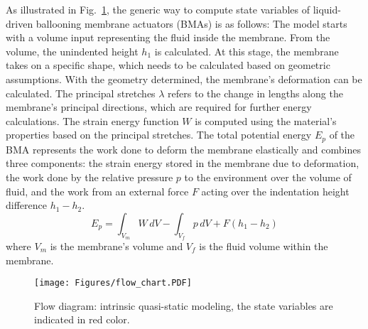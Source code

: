 As illustrated in Fig.~\ref{fig: flow_chart}, the generic way to compute state variables of liquid-driven ballooning membrane actuators (BMAs) is as follows:
The model starts with a volume input representing the fluid inside the membrane. From the volume, the unindented height $h_1$ is calculated. At this stage, the membrane takes on a specific shape, which needs to be calculated based on geometric assumptions. With the geometry determined, the membrane’s deformation can be calculated. The principal stretches $\lambda$ refers to the change in lengths along the membrane's principal directions, which are required for further energy calculations. The strain energy function $W$ is computed using the material's properties based on the principal stretches. The total potential energy 
$E_p$ of the BMA represents the work done to deform the membrane elastically and combines three components: the strain energy stored in the membrane due to deformation, the work done by the relative pressure $p$ to the environment over the volume of fluid, and the work from an external force 
$F$ acting over the indentation height difference $h_1-h_2$.
\begin{equation}
    E_p=\int_{V_m} W \,dV-\int_{V_f} p \,dV + F(h_1-h_2)
    \label{Eq:E_p_prior_art}
\end{equation}
where $V_m$ is the membrane's volume and $V_f$ is the fluid volume within the membrane.
\begin{figure}[thpb]
  \centering
  \texttt{[image: Figures/flow\_chart.PDF]}
  \caption{Flow diagram: intrinsic quasi-static modeling, the state variables are indicated in red color.}
  \label{fig: flow_chart}
\end{figure}